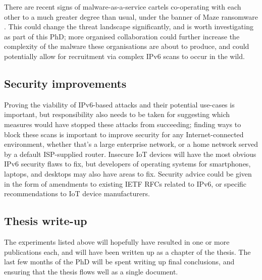 \documentclass[10pt,sigconf]{acmart}
\begin{document}
There are recent signs of malware-as-a-service cartels co-operating with each other to a much greater degree than usual, under the banner of Maze ransomware \cite{maze-ransomware}.
This could change the threat landscape significantly, and is worth investigating as part of this PhD;
more organised collaboration could further increase the complexity of the malware these organisations are about to produce, and could potentially allow for recruitment via complex IPv6 scans to occur in the wild.

\subsection{Security improvements}
Proving the viability of IPv6-based attacks and their potential use-cases is important, but responsibility also needs to be taken for suggesting which measures would have stopped these attacks from succeeding;
finding ways to block these scans is important to improve security for any Internet-connected environment, whether that's a large enterprise network, or a home network served by a default ISP-supplied router.
Insecure IoT devices will have the most obvious IPv6 security flaws to fix, but developers of operating systems for smartphones, laptops, and desktops may also have areas to fix.
Security advice could be given in the form of amendments to existing IETF RFCs related to IPv6, or specific recommendations to IoT device manufacturers.

\subsection{Thesis write-up}
The experiments listed above will hopefully have resulted in one or more publications each, and will have been written up as a chapter of the thesis.
The last few months of the PhD will be spent writing up final conclusions, and ensuring that the thesis flows well as a single document.


%




\end{document}
